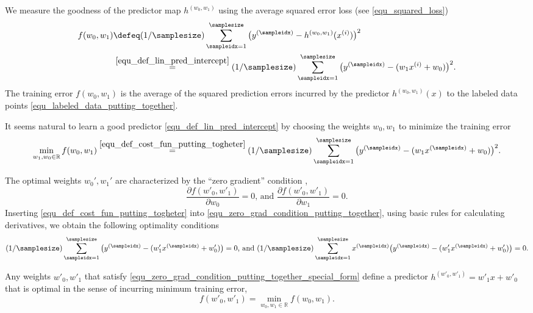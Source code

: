 \documentclass[12pt]{report}
\begin{document}
We measure the goodness of the predictor map $h^{(w_{0},w_{1})}$ 
using the average squared error loss (see \eqref{equ_squared_loss})
\begin{align}
\label{equ_def_cost_fun_putting_togheter}
f(w_{0},w_{1}) & \defeq (1/\samplesize) \sum_{\sampleidx=1}^{\samplesize} \big( y^{(\sampleidx)} - h^{(w_{0},w_{1})}(x^{(i)})  \big)^{2} \nonumber \\
& \stackrel{\eqref{equ_def_lin_pred_intercept}}{=}  (1/\samplesize) \sum_{\sampleidx=1}^{\samplesize} \big( y^{(\sampleidx)} - ( w_{1} x^{(i)} + w_{0}) \big)^{2}. 
\end{align}
The training error $f(w_{0},w_{1})$ is the average of the squared 
prediction errors incurred by the predictor $h^{(w_{0},w_{1})}(x)$ 
to the labeled data points \eqref{equ_labeled_data_putting_together}. 

It seems natural to learn a good predictor \eqref{equ_def_lin_pred_intercept} by choosing 
the weights $w_{0},w_{1}$ to minimize the training error 
\begin{equation}
\min_{w_{1},w_{0} \in \mathbb{R}} f(w_{0},w_{1}) \stackrel{\eqref{equ_def_cost_fun_putting_togheter}}{=}  (1/\samplesize) \sum_{\sampleidx=1}^{\samplesize} \big( y^{(\sampleidx)} - ( w_{1} x^{(\sampleidx)} + w_{0}) \big)^{2}.
\end{equation} 

The optimal weights $w_{0}',w_{1}'$ are characterized by the ``zero gradient'' condition \cite{}, 
\begin{equation}
\label{equ_zero_grad_condition_putting_together}
\frac{\partial f(w'_{0},w'_{1})}{\partial w_{0}} = 0 \mbox{, and }\frac{\partial f(w'_{0},w'_{1})}{\partial w_{1}} = 0. 
\end{equation} 
Inserting \eqref{equ_def_cost_fun_putting_togheter} into \eqref{equ_zero_grad_condition_putting_together}, 
using basic rules for calculating derivatives, we obtain the following optimality conditions 
\begin{equation}
\label{equ_zero_grad_condition_putting_together_special_form}
 (1/\samplesize) \sum_{\sampleidx=1}^{\samplesize} \big( y^{(\sampleidx)} - ( w'_{1} x^{(\sampleidx)} + w'_{0}) \big)= 0 \mbox{, and } (1/\samplesize) \sum_{\sampleidx=1}^{\samplesize} x^{(\sampleidx)} \big( y^{(\sampleidx)} - ( w'_{1} x^{(\sampleidx)} + w'_{0}) \big) = 0. 
\end{equation} 

Any weights $w'_{0},w'_{1}$ that satisfy \eqref{equ_zero_grad_condition_putting_together_special_form} 
define a predictor $h^{(w'_{0},w'_{1})} = w'_{1}x + w'_{0}$ that 
is optimal in the sense of incurring minimum training error, 
$$f(w'_{0},w'_{1}) = \min_{w_{0},w_{1} \in \mathbb{R}} f(w_{0},w_{1}).$$
\end{document}
